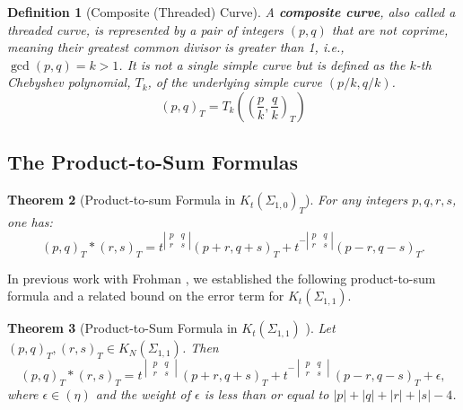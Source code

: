 \documentclass[12pt]{article}
\newtheorem{theorem}{Theorem}[section]
\newtheorem{definition}[theorem]{Definition}
\begin{document}
\begin{definition}[Composite (Threaded) Curve]
A \textbf{composite curve}, also called a threaded curve, is represented by a pair of integers $(p,q)$ that are not coprime, meaning their greatest common divisor is greater than 1, i.e., $\gcd(p,q) = k > 1$. It is not a single simple curve but is defined as the $k$-th Chebyshev polynomial, $T_k$, of the underlying simple curve $(p/k, q/k)$.
\[
(p,q)_T = T_k\left(\left(\frac{p}{k}, \frac{q}{k}\right)_T\right)
\]
\end{definition}

\subsection{The Product-to-Sum Formulas}
\begin{theorem}[Product-to-sum Formula in $K_t(\Sigma_{1,0})_T ${\cite[Theorem 4.1]{frohmangelca}}]
For any integers $p,q,r,s$, one has:
\[
(p,q)_T \ast (r,s)_T = t^{\left|\begin{smallmatrix} p & q \\ r & s \end{smallmatrix}\right|}(p+r,q+s)_T + t^{-\left|\begin{smallmatrix} p & q \\ r & s \end{smallmatrix}\right|}(p-r,q-s)_T.
\]
\end{theorem}
In previous work with Frohman \cite{abdiel2014}, we established the following product-to-sum formula and a related bound on the error term for $K_t(\Sigma_{1,1})$.








\begin{theorem}[Product-to-Sum Formula in $K_t(\Sigma_{1,1})$ {\cite[Theorem 6.1]{abdiel2014}}]
Let $(p,q)_T, (r,s)_T \in K_N(\Sigma_{1,1})$. Then
\[
(p,q)_T \ast (r,s)_T
= t^{\begin{vmatrix} p & q \\ r & s \end{vmatrix}} (p + r, q + s)_T
+ t^{- \begin{vmatrix} p & q \\ r & s \end{vmatrix}} (p - r, q - s)_T
+ \epsilon,
\]
where $\epsilon \in (\eta)$ and the weight of $\epsilon$ is less than or equal to $|p| + |q| + |r| + |s| - 4$.
\end{theorem}
\end{document}
